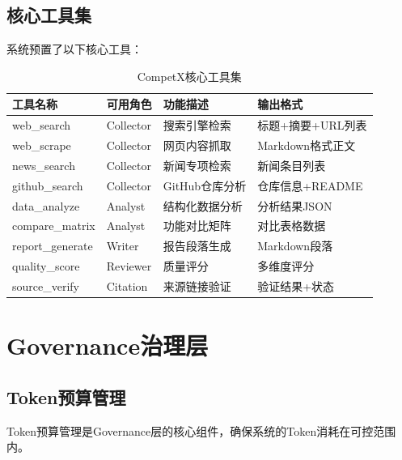 \documentclass[12pt,a4paper]{ctexrep}
\begin{document}
\subsection{核心工具集}

系统预置了以下核心工具：

\begin{table}[H]
\centering
\caption{CompetX核心工具集}
\label{tab:tools}
{\small
\begin{tabular}{p{3cm} p{2cm} p{4cm} p{4cm}}
\toprule
\textbf{工具名称} & \textbf{可用角色} & \textbf{功能描述} & \textbf{输出格式} \\
\midrule
web\_search & Collector & 搜索引擎检索 & 标题+摘要+URL列表 \\
\addlinespace
web\_scrape & Collector & 网页内容抓取 & Markdown格式正文 \\
\addlinespace
news\_search & Collector & 新闻专项检索 & 新闻条目列表 \\
\addlinespace
github\_search & Collector & GitHub仓库分析 & 仓库信息+README \\
\addlinespace
data\_analyze & Analyst & 结构化数据分析 & 分析结果JSON \\
\addlinespace
compare\_matrix & Analyst & 功能对比矩阵 & 对比表格数据 \\
\addlinespace
report\_generate & Writer & 报告段落生成 & Markdown段落 \\
\addlinespace
quality\_score & Reviewer & 质量评分 & 多维度评分 \\
\addlinespace
source\_verify & Citation & 来源链接验证 & 验证结果+状态 \\
\bottomrule
\end{tabular}
}
\end{table}

\section{Governance治理层}

\subsection{Token预算管理}

Token预算管理是Governance层的核心组件，确保系统的Token消耗在可控范围内。
\end{document}
